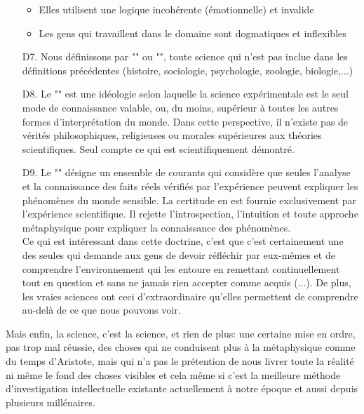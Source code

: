 \begin{itemize}
\begin{itemize}
			\item Elles utilisent une logique incoh\'erente (\'emotionnelle) et invalide
	
			\item Les gens qui travaillent dans le domaine sont dogmatiques et inflexibles
		\end{itemize}
	
		\item[D7.] Nous d\'efinissons par "" ou "", toute science qui n'est pas inclue dans les d\'efinitions pr\'ec\'edentes (histoire, sociologie, psychologie, zoologie, biologie,...)
	
		\item[D8.] Le "" est une id\'eologie selon laquelle la science exp\'erimentale est le seul mode de connaissance valable, ou, du moins, sup\'erieur à toutes les autres formes d'interpr\'etation du monde. Dans cette perspective, il n'existe pas de v\'erit\'es philosophiques, religieuses ou morales sup\'erieures aux th\'eories scientifiques. Seul compte ce qui est scientifiquement d\'emontr\'e.
	
		\item[D9.] Le "" d\'esigne un ensemble de courants qui considère que seules l'analyse et la connaissance des faits r\'eels v\'erifi\'es par l'exp\'erience peuvent expliquer les ph\'enomènes du monde sensible. La certitude en est fournie exclusivement par l'exp\'erience scientifique. Il rejette l'introspection, l'intuition et toute approche m\'etaphysique pour expliquer la connaissance des ph\'enomènes.\\
		
		Ce qui est int\'eressant dans cette doctrine, c'est que c'est certainement une des seules qui demande aux gens de devoir r\'efl\'echir par eux-mêmes et de comprendre l'environnement qui les entoure en remettant continuellement tout en question et sans ne jamais rien accepter comme acquis (...). De plus, les vraies sciences ont ceci d'extraordinaire qu'elles permettent de comprendre au-delà de ce que nous pouvons voir.
	\end{itemize}

Mais enfin, la science, c'est la science, et rien de plus: une certaine mise en ordre, pas trop mal r\'eussie, des choses qui ne conduisent plus à la m\'etaphysique comme du temps d'Aristote, mais qui n'a pas le pr\'etention de nous livrer toute la r\'ealit\'e ni même le fond des choses visibles et cela même si c'est la meilleure m\'ethode d'investigation intellectuelle existante actuellement à notre \'epoque et aussi depuis plusieurs mill\'enaires.

